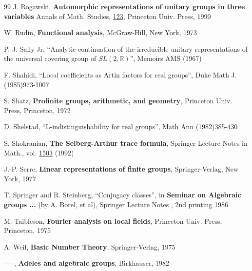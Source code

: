 \begin{thebibliography}{99}
 J. Rogawski,
{\bf Automorphic representations of unitary groups
in three variables}
Annals of Math. Studies, \underline{123}, Princeton Univ. Press, 1990

 W. Rudin, {\bf Functional analysis}, 
McGraw-Hill, New
York, 1973

P. J. Sally Jr, ``Analytic continuation of the irreducible unitary
representations of the universal covering group
of $SL(2,{\mathbb{R}})$'', Memoirs AMS (1967)

F. Shahidi, ``Local coefficients as Artin factors
for real groups'',
Duke Math J. (1985)973-1007


 S. Shatz, {\bf Profinite groups, arithmetic, and
geometry},
Princeton Univ. Press, Princeton, 1972

 D. Shelstad, ``L-indistinguishability for real groups'',
Math
Ann (1982)385-430

 S. Shokranian, {\bf The Selberg-Arthur trace formula},
Springer Lecture Notes in Math., vol. \underline{1503} (1992)


 J.-P. Serre, {\bf Linear representations of finite groups},
Springer-Verlag, New York, 1977

 T. Springer and R. Steinberg, ``Conjugacy classes'',
in {\bf Seminar on Algebraic groups ...} (by A. Borel, et al),
Springer Lecture Notes , 2nd printing 1986

 M. Taibleson, {\bf Fourier analysis on local fields}, 
Princeton Univ.
Press, Princeton, 1975


 A. Weil, {\bf Basic Number Theory},
Springer-Verlag, 1975

 -----, {\bf Adeles and algebraic groups}, 
Birkhauser, 1982


\end{thebibliography}


